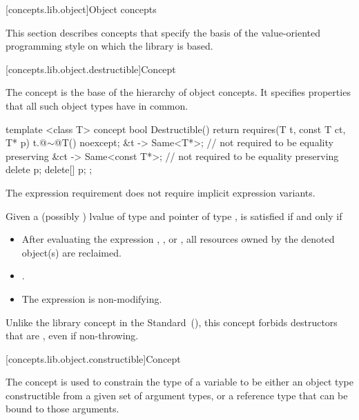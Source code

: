 [concepts.lib.object]{Object concepts}

\pnum
This section describes concepts that specify the basis of the
value-oriented programming style on which the library is based.

[concepts.lib.object.destructible]{Concept }

\pnum
The  concept is the base of the hierarchy of object concepts.
It specifies properties that all such object types have in common.

%
\begin{itemdecl}
template <class T>
concept bool Destructible() {
  return requires(T t, const T ct, T* p) {
    { t.@$\sim$@T() } noexcept;
    { &t } -> Same<T*>; // not required to be equality preserving
    { &ct } -> Same<const T*>; // not required to be equality preserving
    delete p;
    delete[] p;
  };
}
\end{itemdecl}

\begin{itemdescr}
\pnum
The expression requirement  does not require implicit expression variants.

\pnum
Given a (possibly ) lvalue  of type  and pointer
 of type ,  is satisfied if and only if

\begin{itemize}
\item After evaluating the expression ,
, or , all resources owned by
the denoted object(s) are reclaimed.
\item {}.
\item The expression  is non-modifying.
\end{itemize}

\pnum
\enternote Unlike the  library concept in the \Cpp
Standard~(), this concept forbids destructors
that are , even if non-throwing. \exitnote
\end{itemdescr}

[concepts.lib.object.constructible]{Concept }

\pnum
The  concept is used to constrain the type of a
variable to be either an object type constructible from a given set of argument
types, or a reference type that can be bound to those arguments.


